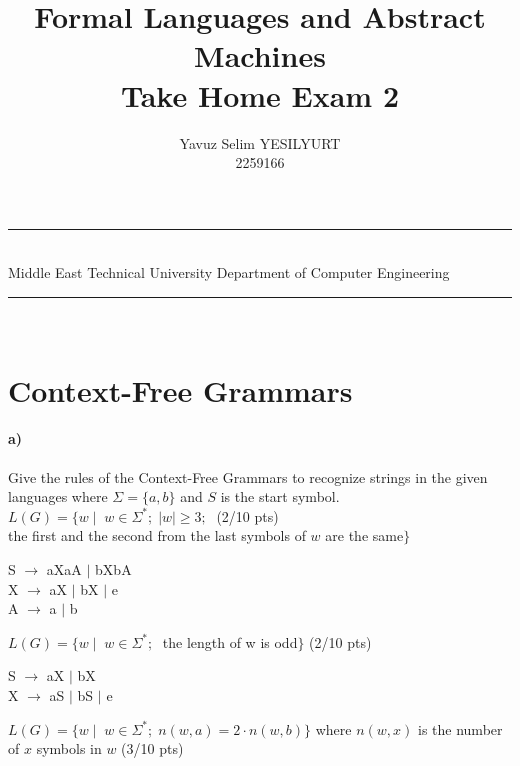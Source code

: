 \documentclass[a4paper,12pt]{article}
\title{Formal Languages and Abstract Machines \\ Take Home Exam 2}
\author{Yavuz Selim YESILYURT \\ 2259166} %
\date{} %
\newcommand{\HRule}{\rule{\linewidth}{1mm}}
\begin{document}
\HRule\\
Middle East Technical University \hfill Department of Computer Engineering
{\let\newpage\relax\maketitle}
\HRule\\
\vspace{1cm}


\section{Context-Free Grammars \hfill {}}

\paragraph{a)} Give the rules of the Context-Free Grammars to recognize strings in the given languages where $\Sigma=\{a,b\}$ and $S$ is the start symbol. \\  

$L(G)=\{w \mid \;  w \in \Sigma^*;\; |w| \geq 3;\; $  \hfill \small{(2/10 pts)} \\
\hspace*{22mm} the first and the second from the last symbols of $w$ are the same$\}$ \\

\begin{tcolorbox}
S $\rightarrow$ aXaA $|$ bXbA \\
X $\rightarrow$ aX $|$ bX $|$ e \\
A $\rightarrow$ a $|$ b \\
\end{tcolorbox}


$L(G)=\{w \mid \;  w \in \Sigma^*;\; $ the length of w is odd$\}$ \hfill \small{(2/10 pts)} \\

\begin{tcolorbox}
S $\rightarrow$ aX $|$ bX \\
X $\rightarrow$ aS $|$ bS $|$ e \\
\end{tcolorbox}


$L(G)=\{w \mid \;  w \in \Sigma^*;\; n(w,a)=2\cdot n(w,b)\}$ where $n(w,x)$ is the number of $x$ symbols in $w$ \hfill \small{(3/10 pts)} \\
\end{document}
